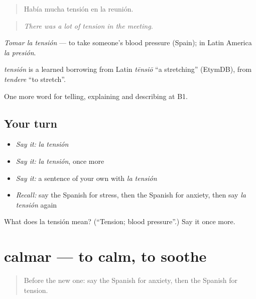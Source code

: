 \begin{quote}
Había mucha tensión en la reunión.
\end{quote}

\begin{quote}
\emph{There was a lot of tension in the meeting.}
\end{quote}

\emph{Tomar la tensión} — to take someone's blood pressure (Spain); in Latin America \emph{la presión}.

\begin{cousinweb}
\emph{tensión} is a learned borrowing from Latin \emph{tēnsiō} \textquotedblleft{}a stretching\textquotedblright{} (EtymDB), from \emph{tendere} \textquotedblleft{}to stretch\textquotedblright{}.
\end{cousinweb}

\begin{grammarlens}[title={What you've built}]
One more word for telling, explaining and describing at B1.
\end{grammarlens}

\subsection*{Your turn}
\begin{itemize}
\raggedright
  \item \emph{Say it:} \emph{la tensión}
  \item \emph{Say it:} \emph{la tensión}, once more
  \item \emph{Say it:} a sentence of your own with \emph{la tensión}
  \item \emph{Recall:} say the Spanish for stress, then the Spanish for anxiety, then say \emph{la tensión} again
\end{itemize}

\begin{tcolorbox}[breakable,colback=teal!4,colframe=teal!35!black,title={Before you move on}]
What does la tensión mean? (\textquotedblleft{}Tension; blood pressure\textquotedblright{}.) Say it once more.
\end{tcolorbox}
\section[calmar]{calmar — to calm, to soothe}

\label{lesson:ES-C710-calmar}



\begin{quote}
Before the new one: say the Spanish for anxiety, then the Spanish for tension.
\end{quote}

